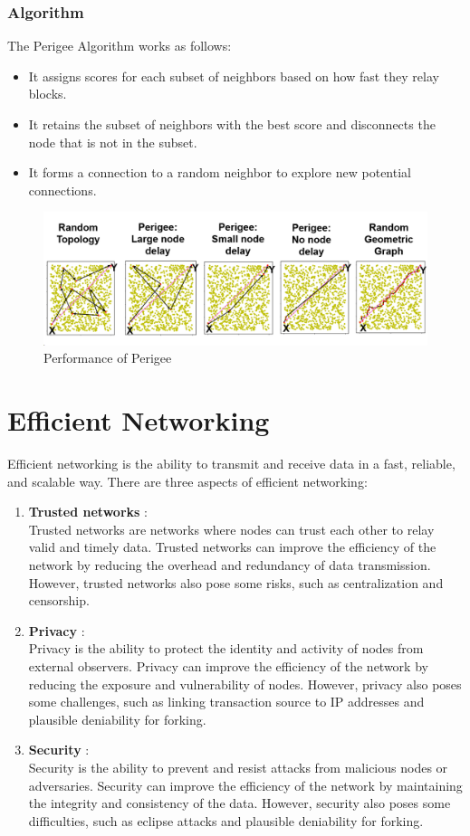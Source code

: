 \subsubsection{Algorithm}
The Perigee Algorithm works as follows:
\begin{itemize}
    \item It assigns scores for each subset of neighbors based on how fast they relay blocks.
    \item It retains the subset of neighbors with the best score and disconnects the node that is not in the subset.
    \item It forms a connection to a random neighbor to explore new potential connections.
\end{itemize}
\begin{figure}[h!]
	\centering
	\includegraphics[width=\linewidth]{Fig/04/F5}
	\caption{Performance of Perigee}
	\label{fig:f5}
\end{figure}
\section{Efficient Networking}
Efficient networking is the ability to transmit and receive data in a fast, reliable, and scalable way. There are three aspects of efficient networking:
\begin{enumerate}
   \item \textbf{Trusted networks} : \\
   Trusted networks are networks where nodes can trust each other to relay valid and timely data. Trusted networks can improve the efficiency of the network by reducing the overhead and redundancy of data transmission. However, trusted networks also pose some risks, such as centralization and censorship.
   \item \textbf{Privacy} : \\
   Privacy is the ability to protect the identity and activity of nodes from external observers. Privacy can improve the efficiency of the network by reducing the exposure and vulnerability of nodes. However, privacy also poses some challenges, such as linking transaction source to IP addresses and plausible deniability for forking.
   \item \textbf{Security} : \\
   Security is the ability to prevent and resist attacks from malicious nodes or adversaries. Security can improve the efficiency of the network by maintaining the integrity and consistency of the data. However, security also poses some difficulties, such as eclipse attacks and plausible deniability for forking.
\end{enumerate}
